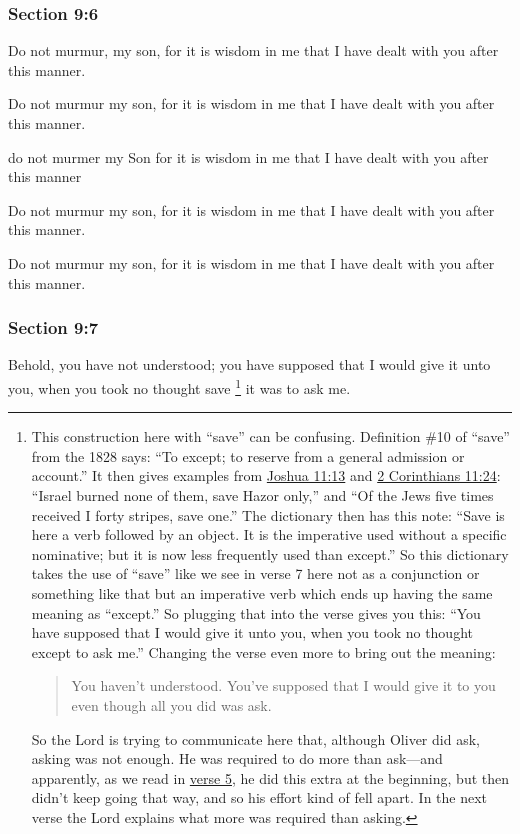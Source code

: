 	\subsubsection{Section 9:6} %
		\label{DC9-6}

		Do not murmur, my son, for it is wisdom in me that I have dealt with you after this manner.

		\begin{framed}
		\scriptsize
			\begin{compactdesc}
				\item[JSP] Do not murmur my son, for it is wisdom in me that I have dealt with you after this manner.
				\item[RB1] do not murmer my Son for it is wisdom in me that I have dealt with you after this manner
				\item[DC 1835] Do not murmur my son, for it is wisdom in me that I have dealt with you after this manner.
				\item[DC 1844] Do not murmur my son, for it is wisdom in me that I have dealt with you after this manner.
			\end{compactdesc}
		\end{framed}

	\subsubsection{Section 9:7} %
		\label{DC9-7}

		Behold, you have not understood; you have supposed that I would give it unto you, when you took no thought save%
			\footnote{%
				This construction here with ``save'' can be confusing. Definition \#10 of ``save'' from the 1828 says: ``To except; to reserve from a general admission or account.'' It then gives examples from \hyperref[JOSHUA-11-13]{Joshua 11:13} and \hyperref[2CORINTHIANS-11-24]{2 Corinthians 11:24}: ``Israel burned none of them, save Hazor only,'' and ``Of the Jews five times received I forty stripes, save one.'' The dictionary then has this note: ``Save is here a verb followed by an object. It is the imperative used without a specific nominative; but it is now less frequently used than except.'' So this dictionary takes the use of ``save'' like we see in verse 7 here not as a conjunction or something like that but an imperative verb which ends up having the same meaning as ``except.'' So plugging that into the verse gives you this: ``You have supposed that I would give it unto you, when you took no thought except to ask me.'' Changing the verse even more to bring out the meaning:
					\begin{quote}
						You haven't understood. You've supposed that I would give it to you even though all you did was ask.
					\end{quote}
				So the Lord is trying to communicate here that, although Oliver did ask, asking was not enough. He was required to do more than ask---and apparently, as we read in \hyperref[DC9-5]{verse 5}, he did this extra at the beginning, but then didn't keep going that way, and so his effort kind of fell apart. In the next verse the Lord explains what more was required than asking.
				}
		it was to ask me.

